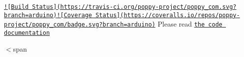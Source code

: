 \href{https://travis-ci.org/poppy-project/poppy_com}{\tt !\mbox{[}Build Status\mbox{]}(https\-://travis-\/ci.\-org/poppy-\/project/poppy\-\_\-com.\-svg?branch=arduino)}\href{https://coveralls.io/github/poppy-project/poppy_com?branch=arduino}{\tt !\mbox{[}Coverage Status\mbox{]}(https\-://coveralls.\-io/repos/poppy-\/project/poppy\-\_\-com/badge.\-svg?branch=arduino)} Please read \href{http://poppy-project.github.io/poppy_com/}{\tt the code documentation}

$<$span 